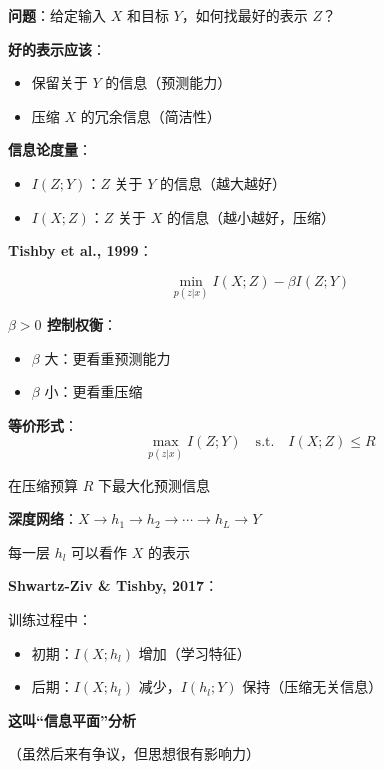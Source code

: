 \documentclass[12pt, a4paper]{ctexart}
\begin{document}
\begin{blackboard}[信息瓶颈的动机]

\textbf{问题}：给定输入 $X$ 和目标 $Y$，如何找最好的表示 $Z$？

\textbf{好的表示应该}：
\begin{itemize}
    \item 保留关于 $Y$ 的信息（预测能力）
    \item 压缩 $X$ 的冗余信息（简洁性）
\end{itemize}

\textbf{信息论度量}：
\begin{itemize}
    \item $I(Z; Y)$：$Z$ 关于 $Y$ 的信息（越大越好）
    \item $I(X; Z)$：$Z$ 关于 $X$ 的信息（越小越好，压缩）
\end{itemize}

\end{blackboard}

\begin{blackboard}[信息瓶颈目标]

\textbf{Tishby et al., 1999}：

\[
\boxed{\min_{p(z|x)} I(X; Z) - \beta I(Z; Y)}
\]

\textbf{$\beta > 0$ 控制权衡}：
\begin{itemize}
    \item $\beta$ 大：更看重预测能力
    \item $\beta$ 小：更看重压缩
\end{itemize}

\textbf{等价形式}：
\[
\max_{p(z|x)} I(Z; Y) \quad \text{s.t.} \quad I(X; Z) \leq R
\]

在压缩预算 $R$ 下最大化预测信息

\end{blackboard}

\begin{blackboard}[信息瓶颈与深度学习]

\textbf{深度网络}：$X \to h_1 \to h_2 \to \cdots \to h_L \to Y$

每一层 $h_l$ 可以看作 $X$ 的表示

\textbf{Shwartz-Ziv \& Tishby, 2017}：

训练过程中：
\begin{itemize}
    \item 初期：$I(X; h_l)$ 增加（学习特征）
    \item 后期：$I(X; h_l)$ 减少，$I(h_l; Y)$ 保持（压缩无关信息）
\end{itemize}

\textbf{这叫``信息平面''分析}

（虽然后来有争议，但思想很有影响力）

\end{blackboard}
\end{document}

